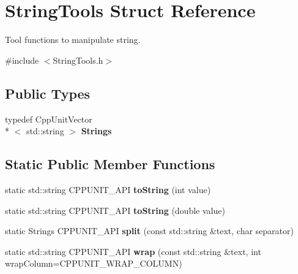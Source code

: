 \hypertarget{struct_string_tools}{\section{String\-Tools Struct Reference}
\label{struct_string_tools}
}


Tool functions to manipulate string.  




{\ttfamily \#include $<$String\-Tools.\-h$>$}

\subsection*{Public Types}
\begin{DoxyCompactItemize}
\item 
\hypertarget{struct_string_tools_ab01d065d80c39015955e9f765cd19921}{typedef Cpp\-Unit\-Vector\\*
$<$ std\-::string $>$ {\bfseries Strings}}\label{struct_string_tools_ab01d065d80c39015955e9f765cd19921}

\end{DoxyCompactItemize}
\subsection*{Static Public Member Functions}
\begin{DoxyCompactItemize}
\item 
\hypertarget{struct_string_tools_a2b4a4cbbfa69a2c28c71bd519ba71e5c}{static std\-::string C\-P\-P\-U\-N\-I\-T\-\_\-\-A\-P\-I {\bfseries to\-String} (int value)}\label{struct_string_tools_a2b4a4cbbfa69a2c28c71bd519ba71e5c}

\item 
\hypertarget{struct_string_tools_adfab22bf90b73231f635aa1ae299d4c4}{static std\-::string C\-P\-P\-U\-N\-I\-T\-\_\-\-A\-P\-I {\bfseries to\-String} (double value)}\label{struct_string_tools_adfab22bf90b73231f635aa1ae299d4c4}

\item 
\hypertarget{struct_string_tools_ac3c3d30a35c82c1d5fcb54e915130767}{static Strings C\-P\-P\-U\-N\-I\-T\-\_\-\-A\-P\-I {\bfseries split} (const std\-::string \&text, char separator)}\label{struct_string_tools_ac3c3d30a35c82c1d5fcb54e915130767}

\item 
\hypertarget{struct_string_tools_a02d43819e61394264c3e75c24433a057}{static std\-::string C\-P\-P\-U\-N\-I\-T\-\_\-\-A\-P\-I {\bfseries wrap} (const std\-::string \&text, int wrap\-Column=C\-P\-P\-U\-N\-I\-T\-\_\-\-W\-R\-A\-P\-\_\-\-C\-O\-L\-U\-M\-N)}\label{struct_string_tools_a02d43819e61394264c3e75c24433a057}

\end{DoxyCompactItemize}


